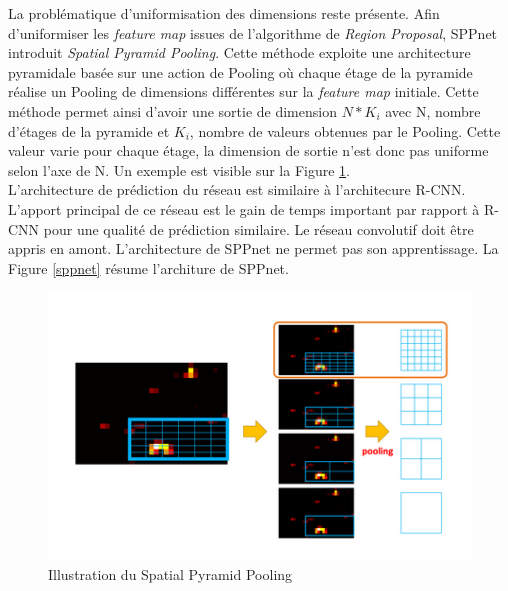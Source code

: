 \noindent La problématique d'uniformisation des dimensions reste présente. Afin d'uniformiser les \textit{feature map} issues de l'algorithme de \textit{Region Proposal}, SPPnet introduit \textit{Spatial Pyramid Pooling}. Cette méthode exploite une architecture pyramidale basée sur une action de Pooling où chaque étage de la pyramide réalise un Pooling de dimensions différentes sur la \textit{feature map} initiale. Cette méthode permet ainsi d'avoir une sortie de dimension $N*K_i$ avec N, nombre d'étages de la pyramide et $K_i$, nombre de valeurs obtenues par le Pooling. Cette valeur varie pour chaque étage, la dimension de sortie n'est donc pas uniforme selon l'axe de N. Un exemple est visible sur la Figure \ref{spplayer}.\\

\noindent L'architecture de prédiction du réseau est similaire à l'architecure R-CNN. L'apport principal de ce réseau est le gain de temps important par rapport à R-CNN pour une qualité de prédiction similaire. Le réseau convolutif doit être appris en amont. L'architecture de SPPnet ne permet pas son apprentissage. La Figure \ref{sppnet} résume l'architure de SPPnet.

\begin{figure}
    \centering
    \includegraphics[scale=0.4]{./tex/computer-vision/sota/spplayer.png}
    \caption{Illustration du Spatial Pyramid Pooling}
    \label{spplayer}
\end{figure}

